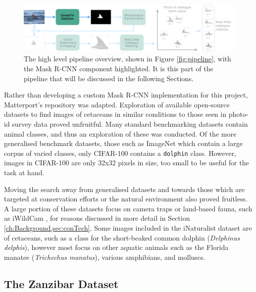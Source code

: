 \begin{figure}[!h]
	\begin{center}
		\includegraphics[width=\linewidth]{Chapter3/figs/pipeline-detector.png}
	\end{center}
	\caption[The high level pipeline overview, shown in Figure \ref{fig:pipeline}, with the Mask R-CNN component highlighted.]{The high level pipeline overview, shown in Figure \ref{fig:pipeline}, with the Mask R-CNN component highlighted. It is this part of the pipeline that will be discussed in the following Sections.}
	\label{fig:pipeline-detector}
\end{figure}

Rather than developing a custom Mask R-CNN implementation for this project, Matterport's repository \cite{waleed_mask_2017} was adapted. Exploration of available open-source datasets to find images of cetaceans in similar conditions to those seen in photo-id survey data proved unfruitful. Many standard benchmarking datasets contain animal classes, and thus an exploration of these was conducted. Of the more generalised benchmark datasets, those such as ImageNet \cite{deng_imagenet:_2009} which contain a large corpus of varied classes, only CIFAR-100 \cite{krizhevsky_learning_2009} contains a \texttt{dolphin} class. However, images in CIFAR-100 are only 32x32 pixels in size, too small to be useful for the task at hand. 

Moving the search away from generalised datasets and towards those which are targeted at conservation efforts or the natural environment also proved fruitless. A large portion of these datasets focus on camera traps or land-based fauna, such as iWildCam \cite{beery_iwildcam_2019}, for reasons discussed in more detail in Section \ref{ch:Background,sec:conTech}. Some images included in the iNaturalist dataset \cite{van_horn_inaturalist_2018} are of cetaceans, such as a class for the short-beaked common dolphin (\textit{Delphinus delphis}), however most focus on other aquatic animals such as the Florida manatee (\textit{Trichechus manatus}), various amphibians, and molluscs. 

\subsection{The Zanzibar Dataset}\label{ch:cetDet,sec:initialTesting,sub:zanzibar}

